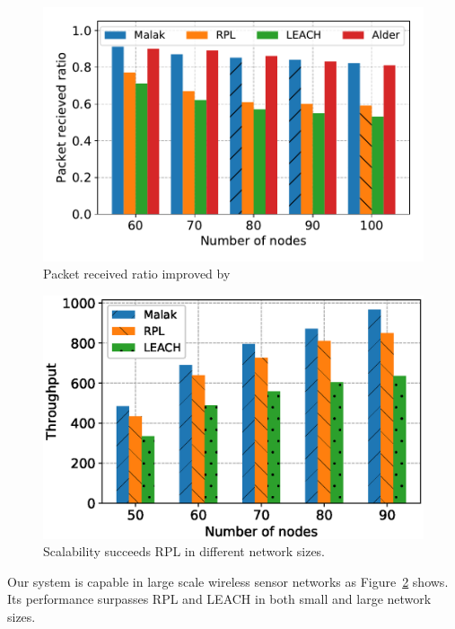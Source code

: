 \begin{figure}[htbp]
	\centering
	\includegraphics[width=.95\columnwidth]{Figure/packet_loss_ratio_with_size}
	\vspace{-0.1in}
	\caption{Packet received ratio improved by {\sdn}}
	\label{fig:packet_loss_ratio_with_size}
\end{figure}



\begin{figure}[htbp]
	\centering
	\includegraphics[width=.95\columnwidth]{Figure/scalability}
	\vspace{-0.1in}
	\caption{Scalability
		\textnormal{
			{\sdn} succeeds RPL in different network sizes.
		}}
	\label{fig:scalability}
\end{figure}

Our {\sdn} system is capable in large scale wireless sensor networks as
Figure~\ref{fig:scalability} shows. Its performance surpasses RPL and LEACH in
both small and large network sizes.

